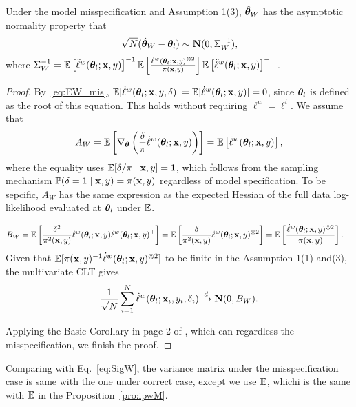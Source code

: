 \documentclass[12pt,hidelinks]{article}
\begin{document}
\begin{proposition}\label{pro:ipwM}
    Under the model misspecification and Assumption 1(3), ${\hat{\bm{\theta}}}_W$ has the asymptotic normality property that 
    \begin{align}
        \sqrt{N} ({\hat{\bm{\theta}}}_W - \bm{\theta}_l) \sim \mathbf{N}(0, \Sigma_W^{-1}),
    \end{align}
    where $\Sigma_W^{-1} = \mathbb{E} \left[\ddot \ell^w( \bm{\theta}_l;\mathbf{x}, y)\right]^{-1} \mathbb{E} \left[\frac{\dot \ell^w( \bm{\theta}_l;\mathbf{x}, y)^{\otimes 2}}{\pi(\mathbf{x}, y)}\right] \mathbb{E} \left[\ddot \ell^w( \bm{\theta}_l;\mathbf{x}, y)\right]^{-\top}$.
\end{proposition}

\begin{proof}
By~\eqref{eq:EW_mis}, $\mathbb{E} [\dot \ell^w( \bm{\theta}_l; \mathbf{x}, y, \delta)] = \mathbb{E}[\dot \ell^w( \bm{\theta}_l; \mathbf{x}, y)] = 0$, since $ \bm{\theta}_l$ is defined as the root of this equation.
This holds without requiring $\ell^w = \ell^t$.
We assume that
\begin{equation*}
    A_W = \mathbb{E} \left[\nabla_{\bm{\theta}} \left(\frac{\delta}{\pi}\dot \ell^w( \bm{\theta}_l;\mathbf{x}, y) \right)\right]= \mathbb{E} \left[\ddot \ell^w( \bm{\theta}_l;\mathbf{x}, y)\right],
\end{equation*}
where the equality uses $\mathbb{E}[\delta/\pi \mid \mathbf{x}, y] = 1$, which follows from the sampling mechanism $\mathbb{P}(\delta=1 \mid \mathbf{x}, y) = \pi(\mathbf{x}, y)$ regardless of model specification.
To be sepcific, $A_W$ has the same expression as the expected Hessian of the full data log-likelihood evaluated at $ \bm{\theta}_l$ under $\mathbb{E}$.


\begin{align*}
    B_W &= \mathbb{E} \left[\frac{\delta^2}{\pi^2(\mathbf{x}, y)} \dot \ell^w( \bm{\theta}_l;\mathbf{x}, y)\dot \ell^w( \bm{\theta}_l;\mathbf{x}, y)^\top\right]
    = \mathbb{E} \left[\frac{\delta}{\pi^2(\mathbf{x}, y)} \dot \ell^w( \bm{\theta}_l;\mathbf{x}, y)^{\otimes 2}\right]
    = \mathbb{E} \left[\frac{\dot \ell^w( \bm{\theta}_l;\mathbf{x}, y)^{\otimes 2}}{\pi(\mathbf{x}, y)}\right].
\end{align*}
Given that $\mathbb{E}[\pi(\mathbf{x}, y)^{-1}\dot \ell^w( \bm{\theta}_l;\mathbf{x}, y)^{\otimes 2}]$ to be finite in the Assumption 1(1) and(3), the multivariate CLT gives
\begin{equation*}
        \frac{1}{\sqrt{N}}\sum_{i=1}^{N} \dot \ell^w(\bm{\theta}_l;  \mathbf{x}_i, y_i, \delta_i) \xrightarrow{d} \mathbf{N}(0, B_W).
\end{equation*}

Applying the Basic Corollary in page 2 of \citet{hjort2011asymptotics}, which can regardless the misspecification, we finish the proof. 
 
\end{proof}
Comparing with Eq.~\eqref{eq:SigW}, the variance matrix under the misspecification case is same with the one under correct case, except we use $\mathbb{E}$, whichi is the same with $\mathbb{E}$ in the Proposition~\ref{pro:ipwM}.
\end{document}
